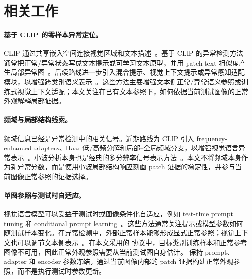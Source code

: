\section{相关工作}
\label{sec:related_work}

\paragraph{基于 CLIP 的零样本异常定位。}
CLIP 通过共享嵌入空间连接视觉区域和文本描述~\cite{radford2021clip}。基于 CLIP 的异常检测方法通常把正常/异常状态写成文本提示或可学习文本原型，并用 patch-text 相似度产生局部异常图~\cite{jeong2023winclip,li2024promptad,zhou2024anomalyclip}。后续路线进一步引入混合提示、视觉上下文提示或异常感知适配模块，以增强跨类别语义表示~\cite{cao2024adaclip,qu2024vcpclip,ma2025aaclip}。这些方法主要增强文本侧正常/异常语义参照或训练式视觉上下文适配；本文关注在已有文本参照下，如何依据当前测试图像的正常外观解释局部证据。

\paragraph{频域与局部结构线索。}
频域信息已经是异常检测中的相关信号。近期路线为 CLIP 引入 frequency-enhanced adapters、Haar 低/高频分解和局部--全局频域分支，以增强视觉语言异常表示~\cite{gong2025feclip,chen2026wmoeclip,zhang2026harmoniad}。小波分析本身也是经典的多分辨率信号表示方法~\cite{daubechies1988orthonormal,mallat1989theory}。本文不将频域本身作为新异常分数，而是使用小波局部结构响应刻画 patch 证据的稳定性，并参与当前图像正常参照的证据选择。

\paragraph{单图参照与测试时自适应。}
视觉语言模型可以受益于测试时或图像条件化自适应，例如 test-time prompt tuning 和 conditional prompt learning~\cite{shu2022tpt,zhou2022cocoop}。这些方法通常关注提示或模型参数如何随测试样本变化。在异常检测中，外部正常样本能够形成显式正常参照；视觉上下文也可以调节文本侧表示~\cite{jeong2023winclip,qu2024vcpclip}。在本文采用的 \clipzsad{} 协议中，目标类别训练样本和正常参考图像不可用，因此正常外观参照需要从当前测试图自身估计。\method{} 保持 prompt、adapter 和 encoder 参数冻结，通过当前图像内部的 patch 证据构建正常外观参照，而不是执行测试时参数更新。
